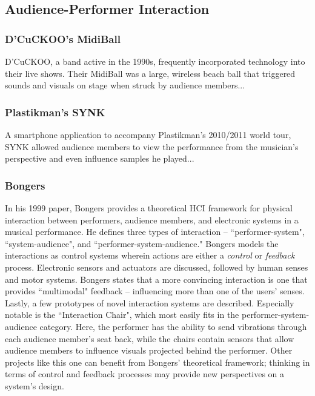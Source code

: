 \subsection{Audience-Performer Interaction}

\subsubsection{D'CuCKOO's MidiBall}

D'CuCKOO, a band active in the 1990s, frequently incorporated technology into their live shows. Their MidiBall was a large, wireless beach ball that triggered sounds and visuals on stage when struck by audience members...

\subsubsection{Plastikman's SYNK}

A smartphone application to accompany Plastikman's 2010/2011 world tour, SYNK allowed audience members to view the performance from the musician's perspective and even influence samples he played...


\subsubsection{Bongers}

In his 1999 paper, Bongers provides a theoretical HCI framework for physical interaction between performers, audience members, and electronic systems in a musical performance. He defines three types of interaction -- ``performer-system", ``system-audience", and ``performer-system-audience." Bongers models the interactions as control systems wherein actions are either a \emph{control} or \emph{feedback} process. Electronic sensors and actuators are discussed, followed by human senses and motor systems. Bongers states that a more convincing interaction is one that provides ``multimodal" feedback -- influencing more than one of the users' senses. Lastly, a few prototypes of novel interaction systems are described. Especially notable is the ``Interaction Chair", which most easily fits in the performer-system-audience category. Here, the performer has the ability to send vibrations through each audience member's seat back, while the chairs contain sensors that allow audience members to influence visuals projected behind the performer. Other projects like this one can benefit from Bongers' theoretical framework; thinking in terms of control and feedback processes may provide new perspectives on a  system's design.

